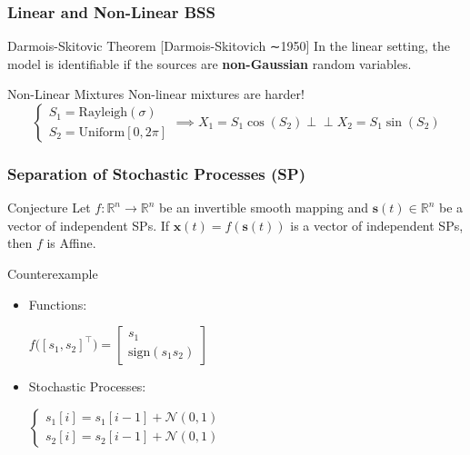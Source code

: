 \documentclass[usenames,dvipsnames]{beamer}
\begin{document}
\begin{frame}
\frametitle{Linear and Non-Linear BSS}
\begin{alertblock}{Darmois-Skitovic Theorem \small{[Darmois-Skitovich ∼1950]}}
In the linear setting, the model is identifiable if the sources are \textbf{non-Gaussian} random variables.
\end{alertblock}
\pause
\begin{exampleblock}{Non-Linear Mixtures}
Non-linear mixtures are harder!
\small{
\begin{equation*}
\begin{cases}

S_1 = \mathrm{Rayleigh}(\sigma)\\
S_2 = \mathrm{Uniform} [0, 2\pi]
\end{cases}
\implies
X_1 = S_1 \cos (S_2) \perp \!\!\! \perp X_2 =  S_1 \sin (S_2)
\end{equation*}
}
\end{exampleblock}
\end{frame}
\normalsize


\begin{frame}
\frametitle{Separation of Stochastic Processes (SP)}

\begin{alertblock}{Conjecture}
Let $f: \mathbb{R}^n \to \mathbb{R}^n$ be an invertible smooth mapping and $\mathbf{s}(t) \in \mathbb{R}^n$ be a vector of independent SPs. If $\mathbf{x}(t) = f(\mathbf{s}(t))$ is a vector of independent SPs, then $f$ is Affine.
\end{alertblock}
\pause

\begin{block}{Counterexample}
	\begin{itemize}
	\item Functions:
	\vspace{0.1cm}	
	
		$ f\big([s_1, s_2]^\top\big)= 
	\begin{bmatrix}
	s_1\\
	\mathrm{sign}(s_1s_2)
	\end{bmatrix}
	$
	
	\item  Stochastic Processes:
	\vspace{0.2cm}
	
	$
	\begin{cases}
	s_1[i] = s_1[i-1] + \mathcal{N}(0,1)\\
	s_2[i] = s_2[i-1] + \mathcal{N}(0,1)
	\end{cases}
	$
	\end{itemize}

\end{block}
\end{frame}
\end{document}

